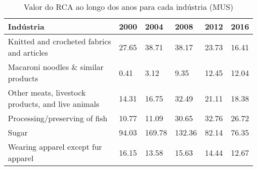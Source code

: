 \begin{table}
\centering
\caption{Valor do RCA ao longo dos anos para cada indústria (MUS)}
\begin{tabular}{p{6cm}p{1.5cm}p{1.5cm}p{1.5cm}p{1.5cm}p{1.5cm}}
\toprule
                                        Indústria &  2000 &   2004 &   2008 &  2012 &  2016 \\
\midrule
       Knitted and crocheted fabrics and articles & 27.65 &  38.71 &  38.17 & 23.73 & 16.41 \\
              Macaroni noodles \& similar products &  0.41 &   3.12 &   9.35 & 12.45 & 12.04 \\
Other meats, livestock products, and live animals & 14.31 &  16.75 &  32.49 & 21.11 & 18.38 \\
                    Processing/preserving of fish & 10.77 &  11.09 &  30.65 & 32.76 & 26.72 \\
                                            Sugar & 94.03 & 169.78 & 132.36 & 82.14 & 76.35 \\
               Wearing apparel except fur apparel & 16.15 &  13.58 &  15.63 & 14.44 & 12.67 \\
\bottomrule
\end{tabular}
\end{table}
